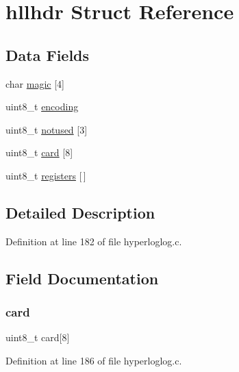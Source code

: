 \hypertarget{structhllhdr}{}\section{hllhdr Struct Reference}
\label{structhllhdr}
\subsection*{Data Fields}
\begin{DoxyCompactItemize}
\item 
char \hyperlink{structhllhdr_a03dedff415badb9581a8ca90e6a45b53}{magic} \mbox{[}4\mbox{]}
\item 
uint8\+\_\+t \hyperlink{structhllhdr_a4c2619391e67c574b601d57922c494bc}{encoding}
\item 
uint8\+\_\+t \hyperlink{structhllhdr_a4fe1afde3770cfaeba9ce0e4c3cdf3c6}{notused} \mbox{[}3\mbox{]}
\item 
uint8\+\_\+t \hyperlink{structhllhdr_a3ae8ca95d6237180e2e44f34cc65c1f1}{card} \mbox{[}8\mbox{]}
\item 
uint8\+\_\+t \hyperlink{structhllhdr_a5ebea196b48e08b90ba84e31f7a516cf}{registers} \mbox{[}$\,$\mbox{]}
\end{DoxyCompactItemize}


\subsection{Detailed Description}


Definition at line 182 of file hyperloglog.\+c.



\subsection{Field Documentation}
\mbox{\label{structhllhdr_a3ae8ca95d6237180e2e44f34cc65c1f1}} 
\subsubsection{\texorpdfstring{card}{card}}
{\footnotesize\ttfamily uint8\+\_\+t card\mbox{[}8\mbox{]}}



Definition at line 186 of file hyperloglog.\+c.

\mbox{\label{structhllhdr_a4c2619391e67c574b601d57922c494bc}} 
